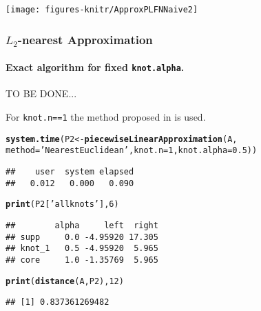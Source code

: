 \documentclass[11pt]{article}\usepackage{graphicx, color}
\makeatletter
\newcommand{\hlfunctioncall}[1]{\textcolor[rgb]{0.501960784313725,0,0.329411764705882}{\textbf{#1}}}%
\newcommand{\hlstring}[1]{\textcolor[rgb]{0.6,0.6,1}{#1}}%
\newenvironment{kframe}{%
 \def\at@end@of@kframe{}%
 \ifinner\ifhmode%
  \def\at@end@of@kframe{\end{minipage}}%
  \begin{minipage}{\columnwidth}%
 \fi\fi%
 \def\FrameCommand##1{\hskip\@totalleftmargin \hskip-\fboxsep
 \colorbox{shadecolor}{##1}\hskip-\fboxsep
     \hskip-\linewidth \hskip-\@totalleftmargin \hskip\columnwidth}%
 \MakeFramed {\advance\hsize-\width
   \@totalleftmargin\z@ \linewidth\hsize
   \@setminipage}}%
 {\par\unskip\endMakeFramed%
 \at@end@of@kframe}
\newenvironment{knitrout}{}{} %
\makeatother
\begin{document}
\begin{center}
\begin{knitrout}\small
{}\color{fgcolor}

{\centering \texttt{[image: figures-knitr/ApproxPLFNNaive2]} 

}



\end{knitrout}

\end{center}


\subsubsection{$L_2$-nearest Approximation}

\paragraph{Exact algorithm for fixed \texttt{knot.alpha}.}

TO BE DONE...

For \texttt{knot.n==1} the method proposed in \cite{CoroianuETAL2012:plfnapprox}
is used.

\begin{knitrout}\small
{}\color{fgcolor}\begin{kframe}
\begin{alltt}
\hlfunctioncall{system.time}(P2 <- \hlfunctioncall{piecewiseLinearApproximation}(A,
   method=\hlstring{'NearestEuclidean'}, knot.n=1, knot.alpha=0.5))
\end{alltt}
\begin{verbatim}
##    user  system elapsed 
##   0.012   0.000   0.090
\end{verbatim}
\begin{alltt}
\hlfunctioncall{print}(P2[\hlstring{'allknots'}], 6)
\end{alltt}
\begin{verbatim}
##        alpha     left  right
## supp     0.0 -4.95920 17.305
## knot_1   0.5 -4.95920  5.965
## core     1.0 -1.35769  5.965
\end{verbatim}
\begin{alltt}
\hlfunctioncall{print}(\hlfunctioncall{distance}(A, P2), 12)
\end{alltt}
\begin{verbatim}
## [1] 0.837361269482
\end{verbatim}
\end{kframe}
\end{knitrout}
\end{document}
